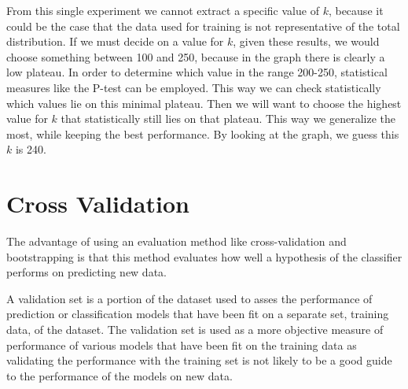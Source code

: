\documentclass[a4paper]{article}
\begin{document}
From this single experiment we cannot extract a specific value of $k$, because it could be the case that the data used for training is not representative of the total distribution. 
If we must decide on a value for $k$, given these results, we would choose something between 100 and 250, because in the graph there is clearly a low plateau. In order to determine which value in the range 200-250, statistical measures like the P-test can be employed. This way we can check statistically which values lie on this minimal plateau. Then we will want to choose the highest value for $k$ that statistically still lies on that plateau. This way we generalize the most, while keeping the best performance. By looking at the graph, we guess this $k$ is 240.

\section{Cross Validation}
The advantage of using an evaluation method like cross-validation and bootstrapping is that this method evaluates how well a hypothesis of the classifier performs on predicting new data.

A validation set is a portion of the dataset used to asses the performance of prediction or classification models that have been fit on a separate set, training data, of the dataset. The validation set is used as a more objective measure of performance of various models that have been fit on the training data as validating the performance with the training set is not likely to be a good guide to the performance of the models on new data.
\end{document}
